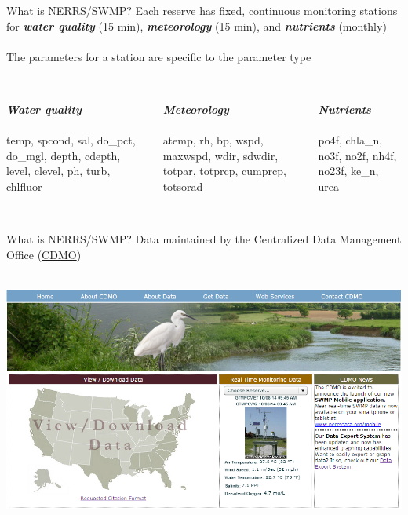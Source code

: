 \documentclass[serif]{beamer}\usepackage[]{graphicx}\usepackage[]{color}
\newcommand{\Bigtxt}[1]{\textbf{\textit{#1}}}
\begin{document}
\begin{frame}{What is NERRS/SWMP?}
Each reserve has fixed, continuous monitoring stations for \Bigtxt{water quality} (15 min), \Bigtxt{meteorology} (15 min), and \Bigtxt{nutrients} (monthly)\\~\\
The parameters for a station are specific to the parameter type \\~\\
\begin{columns}[t]
\begin{column}{0.3\textwidth}
\Bigtxt{Water quality} \\~\\
temp, spcond, sal, do\_pct, do\_mgl, depth, cdepth, level, clevel, ph, turb, chlfluor
\end{column}
\begin{column}{0.3\textwidth}
\Bigtxt{Meteorology} \\~\\
atemp, rh, bp, wspd, maxwspd, wdir, sdwdir, totpar, totprcp, cumprcp, totsorad \\~\\
\end{column}
\begin{column}{0.3\textwidth}
\Bigtxt{Nutrients} \\~\\
po4f, chla\_n, no3f, no2f, nh4f, no23f, ke\_n, urea
\end{column}
\end{columns}
\end{frame}

\begin{frame}[t]{What is NERRS/SWMP?}
Data maintained by the Centralized Data Management Office (\href{http://cdmo.baruch.sc.edu/}{CDMO})\\~\\
\centerline{\includegraphics[width = \textwidth]{fig/cdmo_front.png}}
\end{frame}
\end{document}
